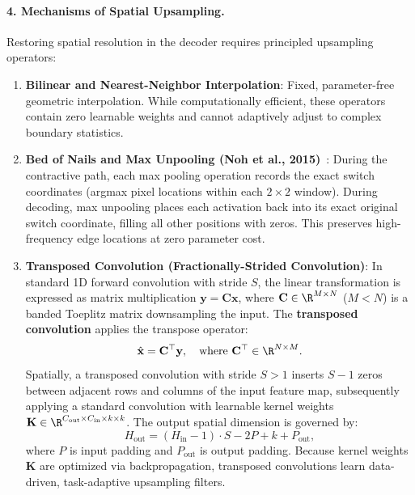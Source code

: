 \paragraph{4. Mechanisms of Spatial Upsampling.}
Restoring spatial resolution in the decoder requires principled upsampling operators:
\begin{enumerate}[leftmargin=*]
  \item \textbf{Bilinear and Nearest-Neighbor Interpolation}: Fixed, parameter-free geometric interpolation. While computationally efficient, these operators contain zero learnable weights and cannot adaptively adjust to complex boundary statistics.
  \item \textbf{Bed of Nails and Max Unpooling (Noh et al., 2015)}~\cite{noh2015learning,zeiler2014visualizing}: During the contractive path, each max pooling operation records the exact switch coordinates (argmax pixel locations within each $2 \times 2$ window). During decoding, max unpooling places each activation back into its exact original switch coordinate, filling all other positions with zeros. This preserves high-frequency edge locations at zero parameter cost.
  \item \textbf{Transposed Convolution (Fractionally-Strided Convolution)}:
    In standard 1D forward convolution with stride $S$, the linear transformation is expressed as matrix multiplication $\mathbf{y} = \mathbf{C} \mathbf{x}$, where $\mathbf{C} \in \R^{M \times N}$ ($M < N$) is a banded Toeplitz matrix downsampling the input.
    The \textbf{transposed convolution} applies the transpose operator:
    \begin{equation}
    \hat{\mathbf{x}} = \mathbf{C}^\top \mathbf{y}, \quad \text{where } \mathbf{C}^\top \in \R^{N \times M}.
    \end{equation}
    Spatially, a transposed convolution with stride $S > 1$ inserts $S - 1$ zeros between adjacent rows and columns of the input feature map, subsequently applying a standard convolution with learnable kernel weights $\mathbf{K} \in \R^{C_{\text{out}} \times C_{\text{in}} \times k \times k}$. The output spatial dimension is governed by:
    \begin{equation}
    H_{\text{out}} = (H_{\text{in}} - 1) \cdot S - 2P + k + P_{\text{out}},
    \label{eq:transposed_conv_output_dim}
    \end{equation}
    where $P$ is input padding and $P_{\text{out}}$ is output padding. Because kernel weights $\mathbf{K}$ are optimized via backpropagation, transposed convolutions learn data-driven, task-adaptive upsampling filters.
\end{enumerate}

